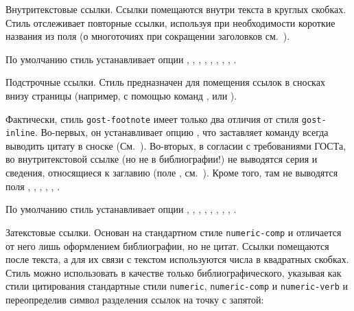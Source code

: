 \documentclass[10pt,a4paper,headings=small,numbers=enddot,english,russian]{ltxdockit}
\newcommand*{\bibsty}{\texttt}
\renewcommand*{\tabref}{\refs{табл.}{табл.}}
\begin{document}
\begin{marglist}

\item[gost-inline]
Внутритекстовые ссылки. Ссылки помещаются внутри текста в круглых скобках.
Стиль отслеживает
повторные ссылки, используя при необходимости короткие названия из поля
 (о многоточиях при сокращении заголовков
см.~).

По умолчанию стиль устанавливает опции , %
, %
, %
, %
, %
, %
, %
, %
.

\item[gost-footnote]
Подстрочные ссылки.
Стиль предназначен для помещения ссылок в сносках внизу страницы (например, с помощью
команд ,  или ).

Фактически, стиль \bibsty{gost-footnote} имеет только два отличия от стиля
\bibsty{gost-inline}.
Во-первых, он устанавливает опцию , что заставляет команду
 всегда выводить цитату в сноске
(См.~). Во-вторых, в согласии с требованиями ГОСТа,
во внутритекстовой ссылке (но не
в библиографии!) не выводятся серия и сведения, относящиеся
к заглавию (поле , см.~\tabref{tab:gost-biblatex}). Кроме того,
там не выводятся поля , ,
, , , .

По умолчанию стиль устанавливает опции , %
, %
, %
, %
, %
, %
, %
, %
.

\item[gost-numeric]
Затекстовые ссылки. Основан на стандартном стиле \bibsty{numeric-comp} и отличается
от него лишь оформлением библиографии, но не цитат. Ссылки помещаются после текста,
а для их связи с текстом используются числа в квадратных скобках. Стиль можно использовать
в качестве только
библиографического, указывая как стили цитирования стандартные стили \bibsty{numeric},
\bibsty{numeric-comp} и \bibsty{numeric-verb} и переопределив символ разделения ссылок на
точку с запятой:


\end{marglist}
\end{document}
